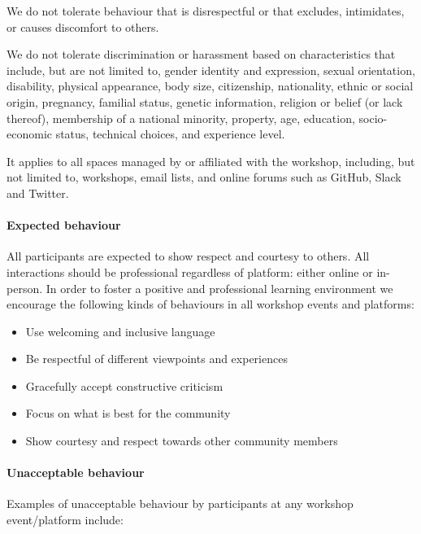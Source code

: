 \documentclass[
]{book}
\providecommand{\tightlist}{%
  \setlength{\itemsep}{0pt}\setlength{\parskip}{0pt}}
\begin{document}
We do not tolerate behaviour that is disrespectful or that excludes, intimidates, or causes discomfort to others.

We do not tolerate discrimination or harassment based on characteristics that include, but are not limited to, gender identity and expression, sexual orientation, disability, physical appearance, body size, citizenship, nationality, ethnic or social origin, pregnancy, familial status, genetic information, religion or belief (or lack thereof), membership of a national minority, property, age, education, socio-economic status, technical choices, and experience level.

It applies to all spaces managed by or affiliated with the workshop, including, but not limited to, workshops, email lists, and online forums such as GitHub, Slack and Twitter.

\hypertarget{expected-behaviour}{%
\paragraph{Expected behaviour}\label{expected-behaviour}}

All participants are expected to show respect and courtesy to others. All interactions should be professional regardless of platform: either online or in-person. In order to foster a positive and professional learning environment we encourage the following kinds of behaviours in all workshop events and platforms:

\begin{itemize}
\tightlist
\item
  Use welcoming and inclusive language
\item
  Be respectful of different viewpoints and experiences
\item
  Gracefully accept constructive criticism
\item
  Focus on what is best for the community
\item
  Show courtesy and respect towards other community members
\end{itemize}

\hypertarget{unacceptable-behaviour}{%
\paragraph{Unacceptable behaviour}\label{unacceptable-behaviour}}

Examples of unacceptable behaviour by participants at any workshop event/platform include:
\end{document}
